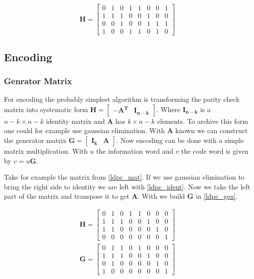 \begin{equation}
	\bm{H} = \left[\begin{matrix}
		0 & 1 & 0 & 1 & 1 & 0 & 0 & 1 \\ 
		1 & 1 & 1 & 0 & 0 & 1 & 0 & 0 \\
		0 & 0 & 1 & 0 & 0 & 1 & 1 & 1 \\
		1 & 0 & 0 & 1 & 1 & 0 & 1 & 0
	\end{matrix}\right] \label{ldpc_mat}
\end{equation}

\subsection{Encoding}
\subsubsection{Genrator Matrix}
For encoding the probably simplest algorithm is transforming the parity check matrix into systematic form $\bm{H} = \left[\begin{matrix} \bm{-A^T} & \bm{I_{n-k}}\end{matrix}\right]$. Where $\bm{I_{n-k}}$ is a $n-k \times n - k$ identity matrix and $\bm{A}$ has $k \times n - k$ elements. To archive this form one could for example use gaussian elimination. With $\bm{A}$ known we can construct the generator matrix $\bm{G} = \left[\begin{matrix} \bm{I_{k}} & \bm{A} \end{matrix}\right]$. Now encoding can be done with a simple matrix multiplication. With $u$ the information word and $v$ the code word is given by $v = u \bm{G}$.

Take for example the matrix from \cref{ldpc_mat}. If we use gaussian elimination to bring the right side to identity we are left with \cref{ldpc_ident}. Now we take the left part of the matrix and transpose it to get $\bm{A}$. With we build $\bm{G}$ in \cref{ldpc_gen}.

\begin{align}
	\bm{H} = \left[\begin{matrix}
		0 & 1 & 0 & 1 & 1 & 0 & 0 & 0 \\
		1 & 1 & 1 & 0 & 0 & 1 & 0 & 0 \\
		1 & 1 & 0 & 0 & 0 & 0 & 1 & 0 \\
		0 & 0 & 0 & 0 & 0 & 0 & 0 & 1
	\end{matrix} \right] \label{ldpc_ident} \\
	\bm{G} = \left[\begin{matrix}
		0 & 1 & 1 & 0 & 1 & 0 & 0 & 0 \\
 		1 & 1 & 1 & 0 & 0 & 1 & 0 & 0 \\
 		0 & 1 & 0 & 0 & 0 & 0 & 1 & 0 \\
 		1 & 0 & 0 & 0 & 0 & 0 & 0 & 1
	\end{matrix} \right] \label{ldpc_gen}
\end{align}

